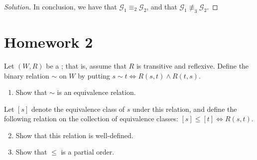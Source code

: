 \documentclass[a4paper, 12pt]{report}
\begin{document}
\begin{proof}[Solution]
        In conclusion, we have that $\mathcal G_1 \equiv_2 \mathcal G_2$, and that $\mathcal G_1 \not\equiv_3 \mathcal G_2$.
    \end{proof}

    \section{Homework 2}

    \newpage

     Let $(W, R)$ be a ; that is, assume that $R$ is transitive and reflexive. Define the binary relation $\sim$ on $W$ by putting $s \sim t \iff R(s, t) \land R(t, s)$.

    \begin{enumerate}[label=(\alph*)]
        \item Show that $\sim$ is an equivalence relation.
    \end{enumerate}

    Let $[s]$ denote the equivalence class of $s$ under this relation, and define the following relation on the collection of equivalence classes: $[s] \le [t] \iff R(s, t)$.

    \begin{enumerate}[label=(\alph*)]
        \setcounter{enumi}{1}
        \item Show that this relation is well-defined.
        \item Show that $\le$ is a partial order.
    \end{enumerate}
\end{document}
